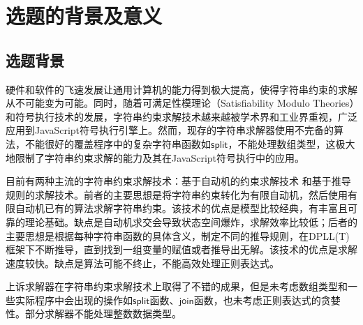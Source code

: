 \newcommand{\join}{\mathsf{join}}
\newcommand{\len}{\mathsf{len}}
\newcommand{\prefix}{\mathsf{prefix}}
\newcommand{\suffix}{\mathsf{suffix}}
\newcommand{\substr}{\mathsf{substr}}
\newcommand{\concat}{\mathsf{concat}}
\newcommand{\test}{\mathsf{test}}
\newcommand{\match}{\mathsf{match}}
\newcommand{\replace}{\mathsf{replace}}
\newcommand{\replaceall}{\mathsf{replaceAll}}
\newcommand{\transducer}{\mathsf{transducer}}
\newcommand{\reverse}{\mathsf{reverse}}
\newcommand{\htmlescape}{\mathsf{htmlEscape}}
\newcommand{\mysplit}{\mathsf{split}}
\newcommand{\myjoin}{\mathsf{join}}
\newcommand{\indexof}{\mathsf{indexof}}
\newcommand{\contain}{\mathsf{contain}}
\section{选题的背景及意义}

\subsection{选题背景}
硬件和软件的飞速发展让通用计算机的能力得到极大提高，使得字符串约束的求解从不可能变为可能。同时，随着可满足性模理论（Satisfiability Modulo Theories）和符号执行技术的发展，字符串约束求解技术越来越被学术界和工业界重视，广泛应用到JavaScript符号执行引擎上。然而，现存的字符串求解器使用不完备的算法，不能很好的覆盖程序中的复杂字符串函数如$\mysplit$，不能处理数组类型，这极大地限制了字符串约束求解的能力及其在JavaScript符号执行中的应用。

目前有两种主流的字符串约束求解技术：基于自动机的约束求解技术\cite{sloth}\cite{abc} \cite{mult_abc}\cite{trau_2017}\cite{trau_2018}\cite{trau+}\cite{ostrich}和基于推导规则的求解技术\cite{z3}\cite{z3str2}\cite{z3str3}\cite{z3str3re}\cite{cvc4_2014}\cite{cvc4_2017}\cite{cvc4_2019}\cite{cvc4_2020}。前者的主要思想是将字符串约束转化为有限自动机，然后使用有限自动机已有的算法求解字符串约束。该技术的优点是模型比较经典，有丰富且可靠的理论基础。缺点是自动机求交会导致状态空间爆炸，求解效率比较低；后者的主要思想是根据每种字符串函数的具体含义，制定不同的推导规则，在DPLL(T) 框架\cite{dpll_t}下不断推导，直到找到一组变量的赋值或者推导出无解。该技术的优点是求解速度较快。缺点是算法可能不终止，不能高效处理正则表达式。

上诉求解器在字符串约束求解技术上取得了不错的成果，但是未考虑数组类型和一些实际程序中会出现的操作如$\mysplit$函数、$\myjoin$函数，也未考虑正则表达式的贪婪性。部分求解器不能处理整数数据类型。

